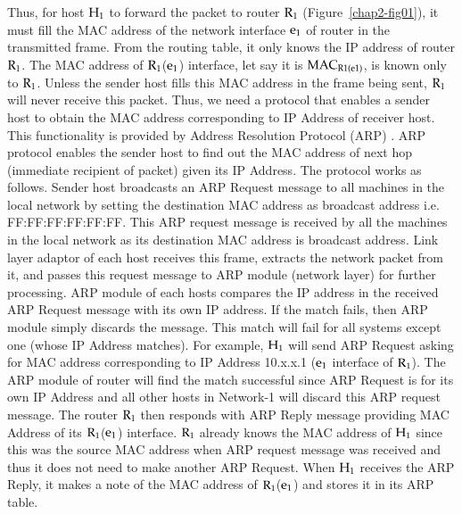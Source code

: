 \begin{multicols}{2}
Thus, for host ${\rm H}_{1}$ to forward the packet to router ${\rm R}_{1}$ (Figure~\ref{chap2-fig01}), it must fill the MAC address of the network interface ${\rm e}_{1}$ of router in the transmitted frame. From the routing table, it only knows the IP address of router ${\rm R}_{1}$. The MAC address of ${\rm R}_{1}$(${\rm e}_{1}$) interface, let say it is ${\rm MAC}_{\rm R1(e1)}$, is known only to ${\rm R}_{1}$. Unless the sender host fills this MAC address in the frame being sent, ${\rm R}_{1}$ will never receive this packet. Thus, we need a protocol that enables a sender host to obtain the MAC address corresponding to IP Address of receiver host. This functionality is provided by Address Resolution Protocol (ARP) \cite{chap2-key03}. ARP protocol enables the sender host to find out the MAC address of next hop (immediate recipient of packet) given its IP Address. The protocol works as follows. Sender host broadcasts an ARP Request message to all machines in the local network by setting the destination MAC address as broadcast address i.e. FF:FF:FF:FF:FF:FF. This ARP request message is received by all the machines in the local network as its destination MAC address is broadcast address. Link layer adaptor of each host receives this frame, extracts the network packet from it, and passes this request message to ARP module (network layer) for further processing. ARP module of each hosts compares the IP address in the received ARP Request message with its own IP address.  If the match fails, then ARP module simply discards the message. This match will fail for all systems except one (whose IP Address matches). For example, ${\rm H}_{1}$ will send ARP Request asking for MAC address corresponding to IP Address 10.x.x.1 (${\rm e}_{1}$ interface of ${\rm R}_{1}$). The ARP module of router will find the match successful since ARP Request is for its own IP Address and all other hosts in Network-1 will discard this ARP request message. The router ${\rm R}_{1}$ then responds with ARP Reply message providing MAC Address of its ${\rm R}_{1}$(${\rm e}_{1}$) interface. ${\rm R}_{1}$ already knows the MAC address of ${\rm H}_{1}$ since this was the source MAC address when ARP request message was received and thus it does not need to make another ARP Request. When ${\rm H}_{1}$ receives the ARP Reply, it makes a note of the MAC address of ${\rm R}_{1}$(${\rm e}_{1}$) and stores it in its ARP table.


\end{multicols}
